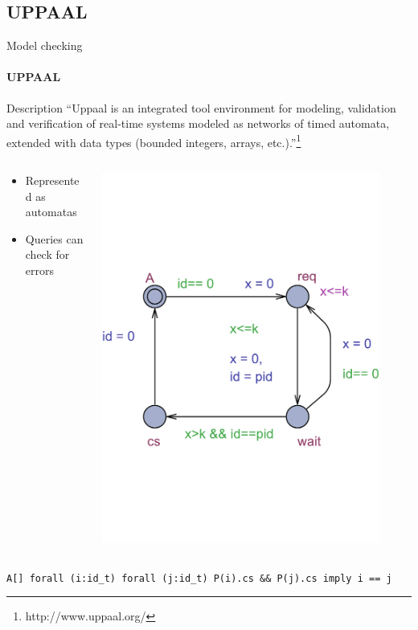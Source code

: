 \subsection{UPPAAL}
\begin{frame}[t]{Model checking}
	\framesubtitle{UPPAAL}
	
	\begin{block}{Description}
		\footnotesize 
		``Uppaal is an integrated tool environment for modeling, 
		validation and verification of real-time systems modeled as networks of timed automata, 
		extended with data types (bounded integers, arrays, etc.).''\footnote{http://www.uppaal.org/}
	\end{block}

	\begin{columns}[T]
		\begin{column}{.48\textwidth}
			\begin{itemize}
				\item Represented as automatas
				\item Queries can check for errors
			\end{itemize}
		\end{column}
		\begin{column}{.48\textwidth}
			\includegraphics[trim=0 200 0 200,width=0.90\textwidth]{images/P.pdf}
		\end{column}
	\end{columns}
	\medskip
	\texttt{A[] forall (i:id\_t) forall (j:id\_t) P(i).cs \&\& P(j).cs imply i == j}\end{frame}

